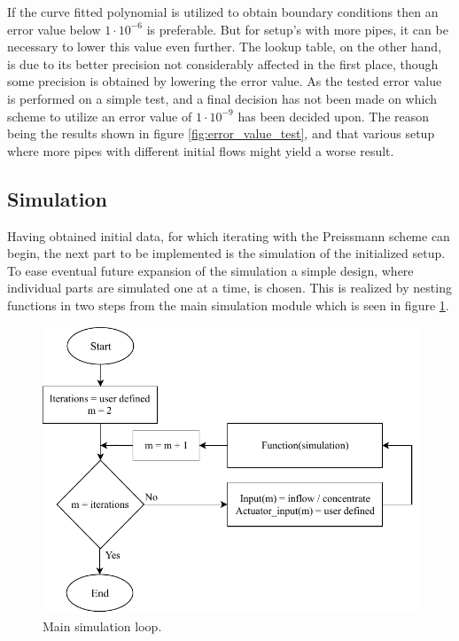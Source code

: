 If the curve fitted polynomial is utilized to obtain boundary conditions then an error value below $1\cdot10^{-6}$ is preferable. But for setup's with more pipes, it can be necessary to lower this value even further. The lookup table, on the other hand, is due to its better precision not considerably affected in the first place, though some precision is obtained by lowering the error value. As the tested error value is performed on a simple test, and a final decision has not been made on which scheme to utilize an error value of $1\cdot10^{-9}$ has been decided upon. The reason being the results shown in figure \ref{fig:error_value_test}, and that various setup where more pipes with different initial flows might yield a worse result.

\subsection*{Simulation}

Having obtained initial data, for which iterating with the Preissmann scheme can begin, the next part to be implemented is the simulation of the initialized setup.
To ease eventual future expansion of the simulation a simple design, where individual parts are simulated one at a time, is chosen. This is realized by nesting functions in two steps from the main simulation module which is seen in figure \ref{fig:simu_main_chart}.

\begin{figure}[H]
\centering
\includegraphics[width=0.7 \textwidth]{report/simulation/pictures/simu_main_chart.pdf}
\caption{Main simulation loop.}
\label{fig:simu_main_chart}
\end{figure}

